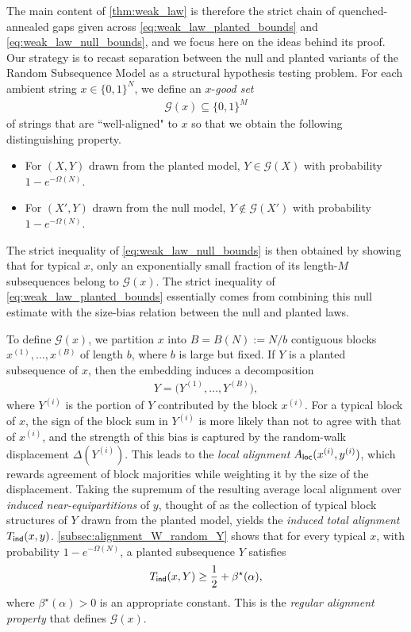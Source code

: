 \documentclass[11pt]{amsart}
\numberwithin{equation}{section}
\numberwithin{equation}{section}
\newcommand{\1}{\mathbbm{1}}
\newcommand{\ind}{\textup{\textsf{ind}}}
\newcommand{\loc}{\textup{\textsf{loc}}}
\theoremstyle{definition}
\begin{document}
The main content of \cref{thm:weak_law} is therefore the strict chain of quenched-annealed gaps given across \eqref{eq:weak_law_planted_bounds} and \eqref{eq:weak_law_null_bounds}, and we focus here on the ideas behind its proof. Our strategy is to recast separation between the null and planted variants of the Random Subsequence Model as a structural hypothesis testing problem. For each ambient string $x \in \{0,1\}^N$, we define an $x$-\textit{good set}
\begin{align*}
    \mathcal G(x) \subseteq \{0,1\}^M
\end{align*}
of strings that are ``well-aligned" to $x$ so that we obtain the following distinguishing property. 
\begin{itemize}
    \item For $(X,Y)$ drawn from the planted model, $Y \in \mathcal G(X)$ with probability $1 - e^{-\Omega(N)}$.

    \item For $(X',Y)$ drawn from the null model, $Y \notin \mathcal G(X')$ with probability $1 - e^{-\Omega(N)}$.
\end{itemize}
The strict inequality of \eqref{eq:weak_law_null_bounds} is then obtained by showing that for typical $x$, only an exponentially small fraction of its length-$M$ subsequences belong to $\mathcal G(x)$. The strict inequality of \eqref{eq:weak_law_planted_bounds} essentially comes from combining this null estimate with the size-bias relation between the null and planted laws.

To define $\mathcal G(x)$, we partition $x$ into $B = B(N) := N/b$ contiguous blocks $x^{(1)},\dots,x^{(B)}$ of length $b$, where $b$ is large but fixed. If $Y$ is a planted subsequence of $x$, then the embedding induces a decomposition
\begin{align*}
    Y = \big(Y^{(1)},\dots,Y^{(B)}\big),
\end{align*}
where $Y^{(i)}$ is the portion of $Y$ contributed by the block $x^{(i)}$. For a typical block of $x$, the sign of the block sum in $Y^{(i)}$ is more likely than not to agree with that of $x^{(i)}$, and the strength of this bias is captured by the random-walk displacement $\Delta(Y^{(i)})$. This leads to the \textit{local alignment} $A_\loc(x^{(i)},y^{(i)})$, which rewards agreement of block majorities while weighting it by the size of the displacement. Taking the supremum of the resulting average local alignment over \textit{induced near-equipartitions} of $y$, thought of as the collection of typical block structures of $Y$ drawn from the planted model, yields the \textit{induced total alignment} $T_\ind(x,y)$. \cref{subsec:alignment_W_random_Y} shows that for every typical $x$, with probability $1 - e^{-\Omega(N)}$, a planted subsequence $Y$ satisfies
\begin{align*}
    T_\ind(x,Y) \geq \frac{1}{2} + \beta^\star(\alpha),
\end{align*}
where $\beta^\star(\alpha) > 0$ is an appropriate constant. This is the \textit{regular alignment property} that defines $\mathcal G(x)$.
\end{document}

